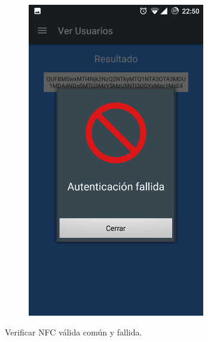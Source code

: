 \documentclass[../PFC.tex]{subfiles}
\begin{document}
\begin{figure}[H]
\begin{subfigure}{0.4\textwidth}
       \includegraphics[width=0.85\textwidth]{./img/app/validacionFallida}
    \end{subfigure}   
  \caption{Verificar NFC válida común y fallida.}
  \label{img:app:verificarNFC1}
\end{figure}

\end{document}
